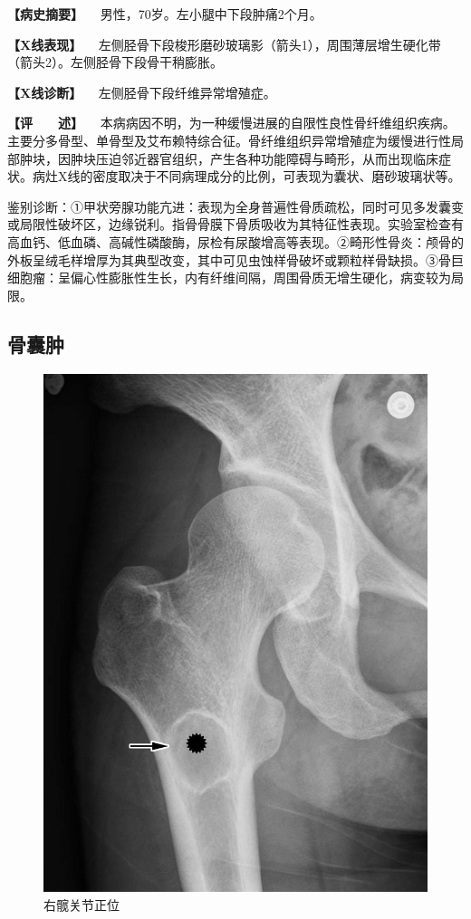 \textbf{【病史摘要】} 　男性，70岁。左小腿中下段肿痛2个月。

\textbf{【X线表现】}
　左侧胫骨下段梭形磨砂玻璃影（箭头1），周围薄层增生硬化带（箭头2）。左侧胫骨下段骨干稍膨胀。

\textbf{【X线诊断】} 　左侧胫骨下段纤维异常增殖症。

\textbf{【评　　述】}
　本病病因不明，为一种缓慢进展的自限性良性骨纤维组织疾病。主要分多骨型、单骨型及艾布赖特综合征。骨纤维组织异常增殖症为缓慢进行性局部肿块，因肿块压迫邻近器官组织，产生各种功能障碍与畸形，从而出现临床症状。病灶X线的密度取决于不同病理成分的比例，可表现为囊状、磨砂玻璃状等。

鉴别诊断：①甲状旁腺功能亢进：表现为全身普遍性骨质疏松，同时可见多发囊变或局限性破坏区，边缘锐利。指骨骨膜下骨质吸收为其特征性表现。实验室检查有高血钙、低血磷、高碱性磷酸酶，尿检有尿酸增高等表现。②畸形性骨炎：颅骨的外板呈绒毛样增厚为其典型改变，其中可见虫蚀样骨破坏或颗粒样骨缺损。③骨巨细胞瘤：呈偏心性膨胀性生长，内有纤维间隔，周围骨质无增生硬化，病变较为局限。

\subsection{骨囊肿}

\begin{figure}[!htbp]
 \centering
 \includegraphics{./images/Image00109.jpg}
 \captionsetup{justification=centering}
 \caption{右髋关节正位}
 \label{fig2-7-24}
  \end{figure} 

